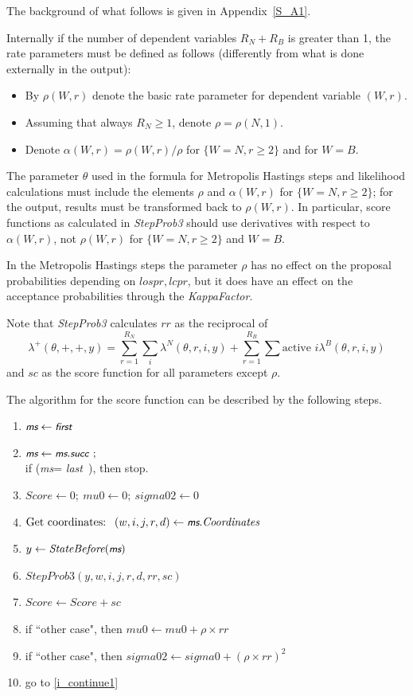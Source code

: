 \documentclass[a4paper,12pt,fleqn]{article}
\newcommand{\nnm}[1]{\textsf{\small\textit{#1}\ }}
\newcommand{\ms}{\textsl{\textsf{\small ms}}} %
\begin{document}
The background of what follows is given in Appendix~\ref{S_A1}.

Internally if the number of dependent variables $R_N + R_B$ is greater than 1,
the rate parameters must be defined as follows (differently from what is done
externally in the output):
\begin{itemize}
\item By $\rho(W,r)$ denote the basic rate parameter for dependent variable
      $(W,r)$.
\item Assuming that always $R_N \geq 1$, denote $\rho = \rho(N,1) $.
\item Denote $\alpha(W,r) = \rho(W,r)/\rho$ for $\{W=N, r \geq 2\}$
      and for $W=B$.
\end{itemize}

The parameter $\theta$ used in the formula for Metropolis Hastings steps
and likelihood calculations must include the elements $\rho$ and
$\alpha(W,r)$ for $\{W=N, r \geq 2\}$;
for the output, results must be transformed back to $\rho(W,r)$.
In particular, score functions as calculated in \textit{StepProb3}
should use derivatives with respect to $\alpha(W,r)$, not $\rho(W,r)$
for $\{W=N, r \geq 2\}$ and $W=B$.

In the Metropolis Hastings steps
the parameter $\rho$ has no effect on the proposal probabilities
depending on $lospr, lcpr$,
but it does have an effect on the acceptance probabilities
through the \textit{KappaFactor}.

Note that \textit{StepProb3} calculates $rr$ as the reciprocal of
\[
   \lambda^+(\theta, +,+, y) = \sum_{r=1}^{R_N} \sum_i \lambda^N(\theta,r,i,y)
           +  \sum_{r=1}^{R_B} \sum{\text{active } i} \lambda^B(\theta,r,i,y)
\]
and $sc$ as the score function for all parameters except $\rho$.

The algorithm for the score function can be described by the following steps.
\begin{enumerate}
\item $\ms \leftarrow \nnm{first}$
\item $\ms \leftarrow \ms.\nnm{succ}; $ \label{i_continue1}\\
      if (\ms = \nnm{last}), then stop.
\item $\textit{Score} \leftarrow 0 ;\ \textit{mu0} \leftarrow 0;\ \textit{sigma02} \leftarrow 0$
\item $ \text{Get coordinates: }\  (w,i,j,r,d) \leftarrow \ms.\textit{Coordinates}$
\item $y \leftarrow \textit{StateBefore}(\ms)$
\item $\textit{StepProb3}(y,w,i,j,r,d,rr,sc)$
\item $ \textit{Score} \leftarrow \textit{Score} + sc$
\item if ``other case", then
       $\textit{mu0} \leftarrow \textit{mu0} + \rho \times rr$ \label{i_mu0}
\item if ``other case", then $\textit{sigma02} \leftarrow
          \textit{sigma0} + (\rho \times rr)^2$  \label{i_sig}
\item go to \ref{i_continue1}
\end{enumerate}
\end{document}
